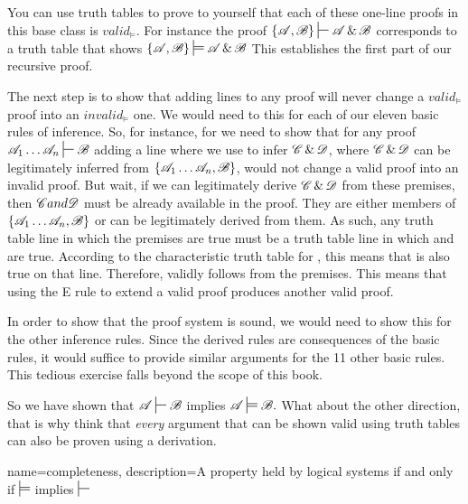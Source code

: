{You can use truth tables to prove to yourself that each of these one-line proofs in this base class is $valid_{\models}$. For instance the proof $\{\script{A}, \script{B}\} \sststile{}{} \script{A} \eand \script{B}$ corresponds to a truth table that shows $\{\script{A}, \script{B}\} \sdtstile{}{} \script{A} \eand \script{B}$ This establishes the first part of our recursive proof. 

The next step is to show that adding lines to any proof will never change a $valid_{\models}$ proof into an $invalid_{\models}$ one. We would need to this for each of our eleven basic rules of inference. So, for instance, for  we need to show that for any proof $\script{A}_{1} \ldots{} \script{A}_{n} \sststile{}{} \script {B}$ adding a line where we use  to infer $\mathscr{C} \,\&\, \mathscr{D}$, where $\mathscr{C} \,\&\, \mathscr{D}$ can be legitimately inferred from $\{\mathscr{A}_{1} \ldots{} \mathscr{A}_{n}, \mathscr{B}\}$, would not change a valid proof into an invalid proof. But wait, if we can legitimately derive $\mathscr{C} \,\&\, \mathscr{D}$ from these premises, then $\mathscr{C} and \mathscr{D}$ must be already available in the proof. They are either members of  $\{\mathscr{A}_{1} \ldots{} \mathscr{A}_{n}, \mathscr{B}\}$ or can be legitimately derived from them. As such, any truth table line in which the premises are true must be a truth table line in which  and  are true. According to the characteristic truth table for \eand, this means that \eand{} is also true on that line. Therefore, \eand{} validly follows from the premises. This means that using the {\eand}E rule to extend a valid proof produces another valid proof.

In order to show that the proof system is sound, we would need to show this for the other inference rules. Since the derived rules are consequences of the basic rules, it would suffice to provide similar arguments for the 11 other basic rules. This tedious exercise falls beyond the scope of this book.

So we have shown that $\script{A} \sststile{}{} \script{B}$ implies $\script{A} \sdtstile{}{}\script{B}.$ What about the other direction, that is why think that \emph{every} argument that can be shown valid using truth tables can also be proven using a derivation. 

{
name=completeness,
description={A property held by logical systems if and only if $\sdtstile{}{}$ implies $\sststile{}{}$}
}

}
